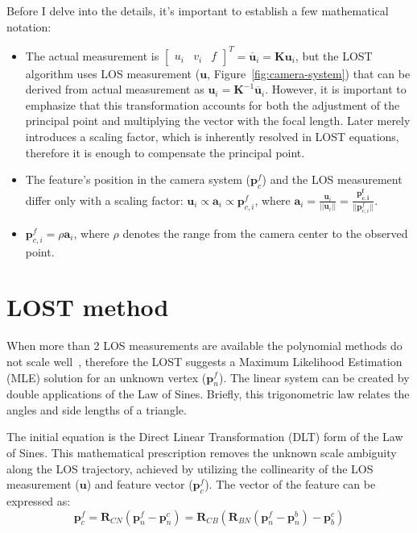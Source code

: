 Before I delve into the details, it's important to establish a few mathematical notation:
\begin{itemize}
    \item 
    The actual measurement is $\begin{bmatrix} u_i & v_i & f\end{bmatrix}^T = \overline{\mathbf{u}}_i = \mathbf{K}\mathbf{u}_i$, but the LOST algorithm uses LOS measurement ($\mathbf{u}$, Figure~\ref{fig:camera-system}) that can be derived from actual measurement as $\mathbf{u}_i=\mathbf{K}^{-1}\overline{\mathbf{u}}_i$. However, it is important to emphasize that this transformation accounts for both the adjustment of the principal point and multiplying the vector with the focal length. Later merely introduces a scaling factor, which is inherently resolved in LOST equations, therefore it is enough to compensate the principal point.

    \item 
    The feature's position in the camera system ($\mathbf{p}_c^f$) and the LOS measurement differ only with a scaling factor: $\mathbf{u}_i \propto \mathbf{a}_{i} \propto \mathbf{p}_{c, i}^f$, where $\mathbf{a}_i=\frac{\mathbf{u}_i}{||\mathbf{u}_i||} = \frac{\mathbf{p_{c, i}^f}}{||\mathbf{p}_{c, i}^f||}$. 

    \item 
    $\mathbf{p}_{c, i}^f=\rho\mathbf{a}_i$, where $\rho$ denotes the range from the camera center to the observed point.
\end{itemize}

\section{LOST method}

When more than 2 LOS measurements are available the polynomial methods do not scale well~\cite{absolute-triangulation}, therefore the LOST suggests a Maximum Likelihood Estimation (MLE) solution for an unknown vertex ($\mathbf{p}_n^f$). The linear system can be created by double applications of the Law of Sines. Briefly, this trigonometric law relates the angles and side lengths of a triangle. 

The initial equation is the Direct Linear Transformation (DLT) form of the Law of Sines. This mathematical prescription removes the unknown scale ambiguity along the LOS trajectory, achieved by utilizing the collinearity of the LOS measurement ($\mathbf{u}$) and feature vector ($\mathbf{p}_c^f$). The vector of the feature can be expressed as: 
\begin{equation}
    \mathbf{p}_c^f=\mathbf{R}_{CN}(\mathbf{p}_n^f-\mathbf{p}_n^c)=\mathbf{R}_{CB}(\mathbf{R}_{BN}(\mathbf{p}_n^f-\mathbf{p}_n^b)-\mathbf{p}_b^c)
    \label{eq:feature-in-cam}
\end{equation}

